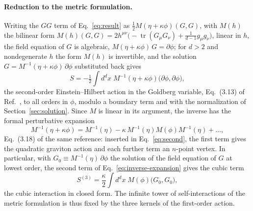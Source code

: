 \documentclass[prd,aps,preprint,superscriptaddress,nofootinbib,amsmath,amssymb,eqsecnum]{revtex4-2}
\begin{document}
\paragraph{Reduction to the metric formulation.} Writing the $GG$ term of Eq.~\eqref{eq:result}
as $\tfrac12 M(\eta+\kappa\phi)(G,G)$, with $M(h)$ the bilinear form
$M(h)(G,G)=2h^{\mu\nu}\big(-\operatorname{tr}(G_\mu G_\nu)+\tfrac{1}{d-1}g_\mu g_\nu\big)$, linear
in $h$, the field equation of $G$ is algebraic, $M(\eta+\kappa\phi)\,G=\partial\phi$; for
$d>2$ and nondegenerate $h$ the form $M(h)$ is invertible, and the solution
$G=M^{-1}(\eta+\kappa\phi)\,\partial\phi$ substituted back gives
\begin{equation}
S=-\tfrac12\int d^dx\;M^{-1}(\eta+\kappa\phi)\big(\partial\phi,\partial\phi\big),
\label{eq:second}
\end{equation}
the second-order Einstein--Hilbert action in the Goldberg variable, Eq.~(3.13) of
Ref.~\cite{BrandtMcKeon2016}, to all orders in $\phi$, modulo a boundary term and with the
normalization of Section~\ref{sec:solution}. Since $M$ is linear in its argument,
the inverse has the formal perturbative expansion
\begin{equation}
M^{-1}(\eta+\kappa\phi)=M^{-1}(\eta)-\kappa\,M^{-1}(\eta)M(\phi)M^{-1}(\eta)+\dots,
\label{eq:inverse-expansion}
\end{equation}
Eq.~(3.18) of the same reference: inserted in Eq.~\eqref{eq:second}, the first term gives
the quadratic graviton action and each further term an $n$-point vertex. In particular,
with $G_0\equiv M^{-1}(\eta)\,\partial\phi$ the solution of the field equation of $G$ at
lowest order, the second term of Eq.~\eqref{eq:inverse-expansion} gives the cubic term
\begin{equation}
S^{(3)}=\frac{\kappa}{2}\int d^dx\;M(\phi)\big(G_0,G_0\big),
\label{eq:cubicvertex}
\end{equation}
the cubic interaction in closed form. The infinite tower of self-interactions of the metric formulation is
thus fixed by the three kernels of the first-order action.
\end{document}

